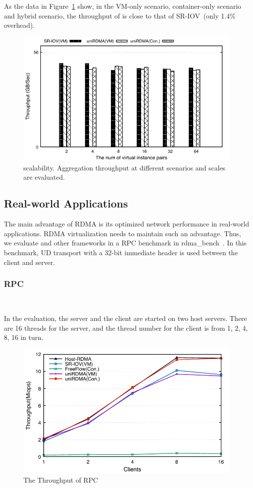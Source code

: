 As the data in Figure~\ref{fig:scabality} show, in the VM-only scenario, container-only scenario and hybrid scenario, the throughput of \sys is close to that of SR-IOV~(only 1.4\% overhead). %


\begin{figure}[!ht]
	\centering
	\includegraphics[width=0.8\linewidth]{images/scabality.pdf}
	\caption{\sys scalability. Aggregation throughput at different scenarios and scales are evaluated.}
	\label{fig:scabality}
\end{figure}

\subsection{Real-world Applications}

The main advantage of RDMA is its optimized network performance in real-world applications. RDMA virtualization needs to maintain such an advantage. Thus, we evaluate \sys and other frameworks in a RPC benchmark in rdma\_bench~\cite{rbench}. In this benchmark, UD transport with a 32-bit immediate header is used between the client and server.

\subsubsection{\textbf{RPC}}
\
\noindent



In the evaluation, the server and the client are started on two host servers. There are 16 threads for the server, and the thread number for the client is from 1, 2, 4, 8, 16 in turn. %

\begin{figure}[!ht]
	\centering
	\includegraphics[width=0.8\linewidth]{images/rpc.pdf}
	\caption{The Throughput of RPC}
	\label{fig:rpc}
\end{figure}

